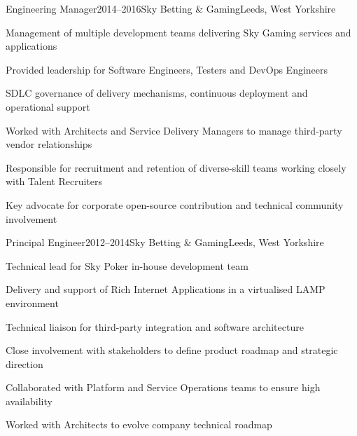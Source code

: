 \documentclass{cv}
\begin{document}

\begin{experience}{Engineering Manager}{2014--2016}{Sky Betting \& Gaming}{Leeds, West Yorkshire}
\item Management of multiple development teams delivering Sky Gaming services and applications
\item Provided leadership for Software Engineers, Testers and DevOps Engineers
\item SDLC governance of delivery mechanisms, continuous deployment and operational support
\item Worked with Architects and Service Delivery Managers to manage third-party vendor relationships
\item Responsible for recruitment and retention of diverse-skill teams working closely with Talent Recruiters
\item Key advocate for corporate open-source contribution and technical community involvement
\end{experience}


\begin{experience}{Principal Engineer}{2012--2014}{Sky Betting \& Gaming}{Leeds, West Yorkshire}
\item Technical lead for Sky Poker in-house development team
\item Delivery and support of Rich Internet Applications in a virtualised LAMP environment
\item Technical liaison for third-party integration and software architecture
\item Close involvement with stakeholders to define product roadmap and strategic direction
\item Collaborated with Platform and Service Operations teams to ensure high availability
\item Worked with Architects to evolve company technical roadmap
\end{experience}

\end{document}
